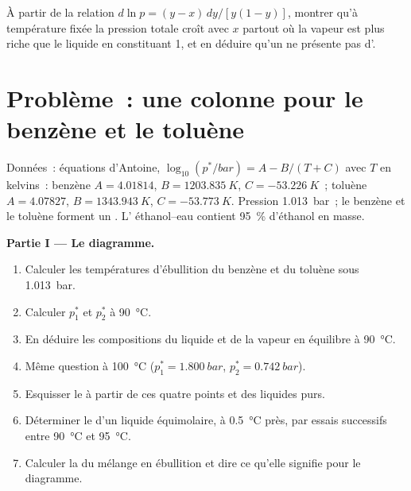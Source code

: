 \begin{exercise}[$\star\star\star$]\label{exo:b2:liquid-vapour-diagrams:12}
À partir de la relation $d\ln p = (y - x)\,dy/[y(1 - y)]$, montrer qu'à température
fixée la pression totale croît avec $x$ partout où la vapeur est
plus riche que le liquide en constituant 1, et en déduire qu'un  ne présente pas
d'.
\end{exercise}

\section{Problème~: une colonne pour le benzène et le toluène}

\begin{problem}
\label{pb:b2:liquid-vapour-diagrams:1}
Données~: équations d'Antoine, $\log_{10}(p^*/\unit{bar}) = A - B/(T + C)$ avec $T$ en
kelvins~: benzène $A = 4.01814$, $B = \qty{1203.835}{K}$, $C =
\qty{-53.226}{K}$~; toluène $A = 4.07827$, $B = \qty{1343.943}{K}$, $C =
\qty{-53.773}{K}$. Pression \qty{1.013}{bar}~; le benzène et le toluène forment un . L' éthanol--eau contient 95~\% d'éthanol en masse.

\medskip
\noindent\textbf{Partie I --- Le diagramme.}
\begin{enumerate}
  \item Calculer les températures d'ébullition du benzène et du toluène sous \qty{1.013}{bar}.
  \item Calculer $p_1^*$ et $p_2^*$ à \qty{90}{\degreeCelsius}.
  \item En déduire les compositions du liquide et de la vapeur en équilibre
        à \qty{90}{\degreeCelsius}.
  \item Même question à \qty{100}{\degreeCelsius} ($p_1^* = \qty{1.800}{bar}$, $p_2^* =
        \qty{0.742}{bar}$).
  \item Esquisser le  à partir de ces quatre points et des liquides purs.
  \item Déterminer le  d'un liquide équimolaire, à
        \qty{0.5}{\degreeCelsius} près, par essais successifs entre \qty{90}{\degreeCelsius} et
        \qty{95}{\degreeCelsius}.
  \item Calculer la  du mélange en ébullition et dire ce qu'elle signifie pour
        le diagramme.
\end{enumerate}


\end{problem}

